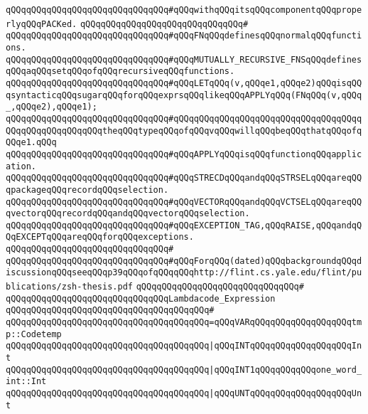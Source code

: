 \verb|qQQqqQQqqQQqqQQqqQQqqQQqqQQqqQQq#qQQqwithqQQqitsqQQqcomponentqQQqproperlyqQQqPACKed.|\newline
\verb|qQQqqQQqqQQqqQQqqQQqqQQqqQQqqQQq#|\newline
\verb|qQQqqQQqqQQqqQQqqQQqqQQqqQQqqQQq#qQQqFNqQQqdefinesqQQqnormalqQQqfunctions.|\newline
\verb|qQQqqQQqqQQqqQQqqQQqqQQqqQQqqQQq#qQQqMUTUALLY_RECURSIVE_FNSqQQqdefinesqQQqaqQQqsetqQQqofqQQqrecursiveqQQqfunctions.|\newline
\verb|qQQqqQQqqQQqqQQqqQQqqQQqqQQqqQQq#qQQqLETqQQq(v,qQQqe1,qQQqe2)qQQqisqQQqsyntacticqQQqsugarqQQqforqQQqexprsqQQqlikeqQQqAPPLYqQQq(FNqQQq(v,qQQq_,qQQqe2),qQQqe1);|\newline
\verb|qQQqqQQqqQQqqQQqqQQqqQQqqQQqqQQq#qQQqqQQqqQQqqQQqqQQqqQQqqQQqqQQqqQQqqQQqqQQqqQQqqQQqqQQqtheqQQqtypeqQQqofqQQqvqQQqwillqQQqbeqQQqthatqQQqofqQQqe1.qQQq|\newline
\verb|qQQqqQQqqQQqqQQqqQQqqQQqqQQqqQQq#qQQqAPPLYqQQqisqQQqfunctionqQQqapplication.|\newline
\verb|qQQqqQQqqQQqqQQqqQQqqQQqqQQqqQQq#qQQqSTRECDqQQqandqQQqSTRSELqQQqareqQQqpackageqQQqrecordqQQqselection.|\newline
\verb|qQQqqQQqqQQqqQQqqQQqqQQqqQQqqQQq#qQQqVECTORqQQqandqQQqVCTSELqQQqareqQQqvectorqQQqrecordqQQqandqQQqvectorqQQqselection.|\newline
\verb|qQQqqQQqqQQqqQQqqQQqqQQqqQQqqQQq#qQQqEXCEPTION_TAG,qQQqRAISE,qQQqandqQQqEXCEPTqQQqareqQQqforqQQqexceptions.|\newline
\verb|qQQqqQQqqQQqqQQqqQQqqQQqqQQqqQQq#|\newline
\verb|qQQqqQQqqQQqqQQqqQQqqQQqqQQqqQQq#qQQqForqQQq(dated)qQQqbackgroundqQQqdiscussionqQQqseeqQQqp39qQQqofqQQqqQQqhttp://flint.cs.yale.edu/flint/publications/zsh-thesis.pdf|\newline
\verb|qQQqqQQqqQQqqQQqqQQqqQQqqQQqqQQq#|\newline
\verb|qQQqqQQqqQQqqQQqqQQqqQQqqQQqqQQqLambdacode_Expression|\newline
\verb|qQQqqQQqqQQqqQQqqQQqqQQqqQQqqQQqqQQqqQQq#|\newline
\verb|qQQqqQQqqQQqqQQqqQQqqQQqqQQqqQQqqQQqqQQq=qQQqVARqQQqqQQqqQQqqQQqqQQqtmp::Codetemp|\newline
\verb|qQQqqQQqqQQqqQQqqQQqqQQqqQQqqQQqqQQqqQQq|\verb#|qQQqINTqQQqqQQqqQQqqQQqqQQqInt#\newline
\verb|qQQqqQQqqQQqqQQqqQQqqQQqqQQqqQQqqQQqqQQq|\verb#|qQQqINT1qQQqqQQqqQQqone_word_int::Int#\newline
\verb|qQQqqQQqqQQqqQQqqQQqqQQqqQQqqQQqqQQqqQQq|\verb#|qQQqUNTqQQqqQQqqQQqqQQqqQQqUnt#\newline
